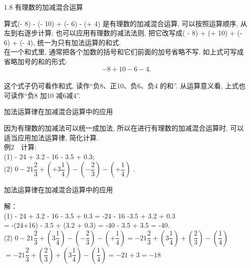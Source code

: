 \begin{frame}[t]{1.8 有理数的加减混合运算}
\begin{spacing}{1.2}
\large
\hspace*{2em} 算式(- 8) - (- 10) + (- 6) - (+ 4) 是有理数的加减混合运算, 可以按照运算顺序, 从左到右逐步计算; 也可以应用有理数的减法法则, 把它改写成( - 8) + (+ 10) + (- 6) + (- 4), 统一为只有加法运算的和式.\\
\hspace{2em} 在一个和式里, 通常把各个加数的括号和它们前面的加号省略不写. 如上式可写成省略加号的和的形式:
\[- 8 + 10 - 6 - 4.\] \\
\hspace*{2em} 这个式子仍可看作和式, 读作“负8、正10、负6、负4 的和”. 从运算意义看, 上式也可读作“负8 加10 减6减4”.
\end{spacing}
\end{frame}


\begin{frame}[t]{加法运算律在加减混合运算中的应用}
\begin{spacing}{1.5}
\large
\hspace{2em} 因为有理数的加减法可以统一成加法, 所以在进行有理数的加减混合运算时, 可以适当应用加法运算律, 简化计算.\\
例2　计算: \\
(1) - 24 + 3.2 - 16 - 3.5 + 0.3; \\
(2) $0 - 21\dfrac{2}{3} + \left(+3\dfrac{1}{4}\right) - \left(-\dfrac{2}{3} \right) - \left(+\dfrac{1}{4} \right)$ . 
\end{spacing}
\end{frame}

\begin{frame}[t]{加法运算律在加减混合运算中的应用}
\begin{spacing}{2.5}
\normalsize
解：\\
(1) - 24 + 3.2 - 16 - 3.5 + 0.3 = -24 - 16 -3.5 + 3.2 + 0.3 \\
= -(24+16) - 3.5 + (3.2 + 0.3) = -40 - 3.5 + 3.5 = -40. \\
(2) $0 - 21\dfrac{2}{3} + \left(3\dfrac{1}{4}\right) - \left(-\dfrac{2}{3} \right) - \left(+\dfrac{1}{4} \right) = - 21\dfrac{2}{3} + \left(3\dfrac{1}{4}\right) + \left(\dfrac{2}{3} \right) - \left(\dfrac{1}{4} \right)$ \\
$= - 21\dfrac{2}{3} + \left(\dfrac{2}{3} \right) + \left(3\dfrac{1}{4}\right) - \left(\dfrac{1}{4} \right) = -21 + 3 = -18$\\
\end{spacing}
\end{frame}